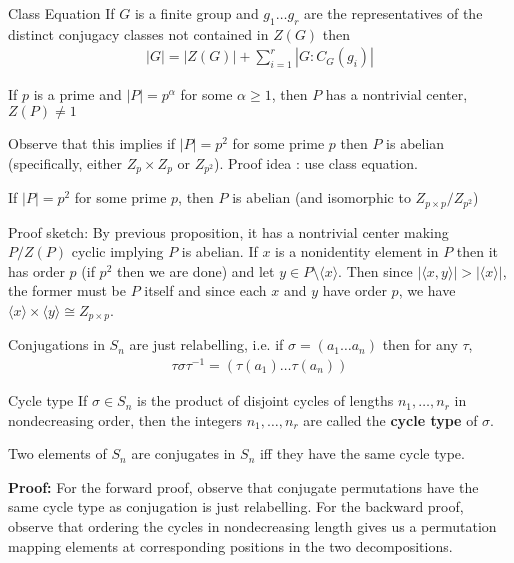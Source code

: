 \documentclass[titlepage, 12pt]{article}
\begin{document}
\begin{theorem}{Class Equation}{}
    If $G$ is a finite group and $g_1\dots g_r$ are the representatives of the
    distinct conjugacy classes not contained in $Z(G)$ then
    \begin{gather*}
        |G| = |Z(G)| + \sum_{i = 1}^r |G : C_G(g_i)|
    \end{gather*}
\end{theorem}

\begin{theorem}{}{}
    If $p$ is a prime and $|P| = p^\alpha$ for some $\alpha\geq 1$, then $P$ has
    a nontrivial center, $Z(P)\neq 1$
\end{theorem}
Observe that this implies if $|P| = p^2$ for some prime $p$ then $P$ is abelian
(specifically, either $Z_p\times Z_p$ or $Z_{p^2}$). Proof idea : use class
equation.

\begin{proposition}{}{}
    If $|P| = p^2$ for some prime $p$, then $P$ is abelian (and isomorphic to
    $Z_{p\times p}/Z_{p^2}$)
\end{proposition}
Proof sketch: By previous proposition, it has a nontrivial center making
$P/Z(P)$ cyclic implying $P$ is abelian. If $x$ is a nonidentity element in $P$
then it has order $p$ (if $p^2$ then we are done) and let $y\in P \setminus
\langle x\rangle$. Then since $|\langle x, y\rangle | > |\langle x\rangle |$,
the former must be $P$ itself and since each $x$ and $y$ have order $p$, we have
$\langle x\rangle \times \langle y\rangle\cong Z_{p\times p}$.

\begin{proposition}{}{}
    Conjugations in $S_n$ are just relabelling, i.e. if $\sigma = (a_1\dots
    a_n)$ then for any $\tau$,
    \begin{gather*}
        \tau\sigma\tau^{-1} = (\tau(a_1)\dots\tau(a_n))
    \end{gather*}
\end{proposition}

\begin{definition}{Cycle type}{}
    If $\sigma\in S_n$ is the product of disjoint cycles of lengths
    $n_1,\dots,n_r$ in nondecreasing order, then the integers $n_1,\dots,n_r$
    are called the \textbf{cycle type} of $\sigma$.
\end{definition}

\begin{proposition}{}{}
    Two elements of $S_n$ are conjugates in $S_n$ iff they have the same cycle
    type.
\end{proposition}
\textbf{Proof:} For the forward proof, observe that conjugate permutations have
the same cycle type as conjugation is just relabelling. For the backward proof,
observe that ordering the cycles in nondecreasing length gives us a permutation
mapping elements at corresponding positions in the two decompositions.
\end{document}
